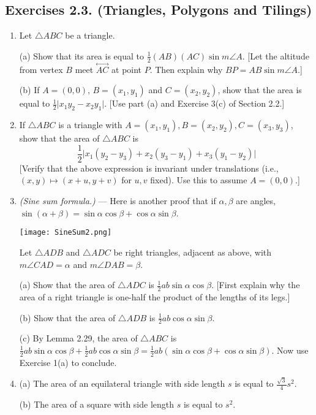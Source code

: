 \documentclass[leqno]{book}
\begin{document}
\subsection*{Exercises 2.3. (Triangles, Polygons and Tilings)}
\begin{enumerate}
\item Let $\triangle ABC$ be a triangle.

(a) Show that its area is equal to $\frac 12(AB)(AC)\sin m\angle A$.  [Let the altitude from vertex $B$ meet $\overset{\longleftrightarrow}{AC}$ at point $P$.  Then explain why $BP=AB\sin m\angle A$.]

(b) If $A=(0,0)$, $B=(x_1,y_1)$ and $C=(x_2,y_2)$, show that the area is equal to $\frac 12\big|x_1y_2-x_2y_1\big|$.  [Use part (a) and Exercise 3(c) of Section 2.2.]

\item If $\triangle ABC$ is a triangle with $A=(x_1,y_1),B=(x_2,y_2),C=(x_3,y_3)$, show that the area of $\triangle ABC$ is
$$\frac 12\big|x_1(y_2-y_3)+x_2(y_3-y_1)+x_3(y_1-y_2)\big|$$
[Verify that the above expression is invariant under translations (i.e., $(x,y)\mapsto(x+u,y+v)$ for $u,v$ fixed).  Use this to assume $A=(0,0)$.]

\item\emph{(Sine sum formula.)} \---- Here is another proof that if $\alpha,\beta$ are angles, $\sin(\alpha+\beta)=\sin\alpha\cos\beta+\cos\alpha\sin\beta$.
\begin{center}\texttt{[image: SineSum2.png]}\end{center}
Let $\triangle ADB$ and $\triangle ADC$ be right triangles, adjacent as above, with $m\angle CAD=\alpha$ and $m\angle DAB=\beta$.

(a) Show that the area of $\triangle ADC$ is $\frac 12ab\sin\alpha\cos\beta$.  [First explain why the area of a right triangle is one-half the product of the lengths of its legs.]

(b) Show that the area of $\triangle ADB$ is $\frac 12ab\cos\alpha\sin\beta$.

(c) By Lemma 2.29, the area of $\triangle ABC$ is $\frac 12ab\sin\alpha\cos\beta+\frac 12ab\cos\alpha\sin\beta=\frac 12ab(\sin\alpha\cos\beta+\cos\alpha\sin\beta)$.  Now use Exercise 1(a) to conclude.

\item (a) The area of an equilateral triangle with side length $s$ is equal to $\frac{\sqrt 3}4s^2$.

(b) The area of a square with side length $s$ is equal to $s^2$.


\end{enumerate}
\end{document}
